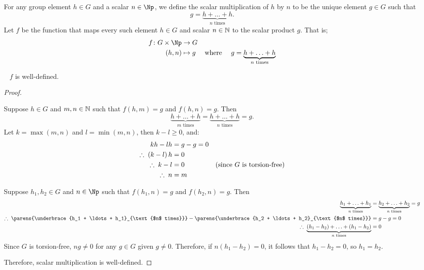 For any group element $h \in G$ and a scalar $n \in \Np$, we define
the scalar multiplication of $h$ by $n$ to be the unique element $g \in G$
such that \[ g = \underbrace{h + \ldots + h}_{\text{$n$ times}}. \]
Let $f$ be the function that maps every such element $h \in G$ and
scalar $n \in \mathbb{N}$ to the scalar product $g$. That is;
\begin{align*}
  f \colon G \times \Np &\to G \\
  (h, n) &\mapsto g \quad \text{ where } \quad g = \underbrace{h + \ldots + h}_{\text{$n$ times}}
\end{align*}

\newpage
\begin{claim}~\label{claim:scalar-multiplication}
  $f$ is well-defined.

  \begin{proof}

    \step
    \begin{enumroman}
    \item Suppose $h \in G$ and $m, n \in \mathbb{N}$ such that $f(h, m) = g$ and $f(h, n) = g$.
    Then
      \[
        \underbrace{h + \ldots + h}_{\text{$m$ times}}
        = \underbrace{h + \ldots + h}_{\text{$n$ times}} = g.
      \]
    Let $k = \max(m, n)$ and $l = \min(m, n)$, then $k - l \geq 0$, and:
    \begin{align*}
      kh - lh &= g - g = 0 \\
      \therefore\; (k - l)\, h &= 0 \\
      \therefore\; k - l &= 0 &\text{(since $G$ is torsion-free)} \\
      \therefore\; n &= m
    \end{align*}

    \item Suppose $h_1, h_2 \in G$  and $n \in \Np$ such that
    $f(h_1, n) = g$ and $f(h_2, n) = g$.
    Then
    \begin{align*}
        \underbrace{h_1 + \ldots + h_1}_{\text{$n$ times}}
        &= \underbrace{h_2 + \ldots + h_2}_{\text{$n$ times}} = g \\
      \Therefore \parens{\underbrace{h_1 + \ldots + h_1}_{\text{$n$ times}}}
      - \parens{\underbrace{h_2 + \ldots + h_2}_{\text{$n$ times}}} &= g - g = 0 \\
      \Therefore \underbrace{(h_1 - h_2) + \ldots + (h_1 - h_2)}_{\text{$n$ times}} &= 0
    \end{align*}
    Since $G$ is torsion-free, $ng \neq 0$ for any $g \in G$ given $g \neq 0$.
    Therefore, if $n(h_1 - h_2) = 0$, it follows that $h_1 -h_2 = 0$,
    so $h_1 = h_2$.
  \end{enumroman}
  \step
  Therefore, scalar multiplication is well-defined.
  \end{proof}

\end{claim}

